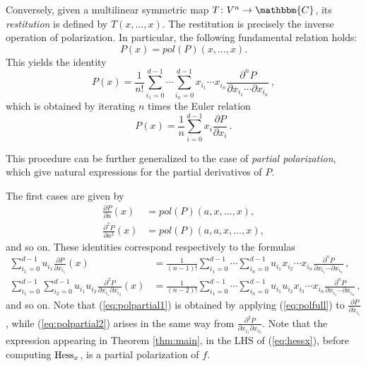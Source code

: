 \documentclass[aps,floatfix,groupedaddress,superscriptaddress,longbibliography,footinbib,notitlepage,showpacs]{revtex4-1}
\def\Hess{{\rm Hess}}
\begin{document}
Conversely, given a multilinear symmetric map $T\colon V^{n}\to\mathbbm{C}$, its \emph{restitution} is defined by 
$T(x,\ldots, x)$. The restitution is precisely the inverse operation of polarization. In particular, the following fundamental relation holds:
\begin{equation}
P(x)=pol(P)(x,\ldots, x).
\end{equation}
This yields the identity
\begin{equation}\label{eq:polfull}
P(x) = \frac{1}{n!}\sum_{i_1=0}^{d-1}\cdots\sum_{i_n=0}^{d-1}
x_{i_1}\cdots x_{i_n}\frac{\partial^n P}{\partial x_{i_1}\cdots \partial x_{i_n}}\,,
\end{equation}
which is obtained by iterating $n$ times the Euler relation
\begin{equation}
P(x)=\frac{1}{n}\sum_{i=0}^{d-1}x_i\frac{\partial P}{\partial x_i}\,.
\end{equation}


This procedure can be further generalized to the case of \emph{partial polarization}, which give natural expressions for the partial derivatives of $P$. 

The first cases are given by
\begin{align}
\frac{\partial P}{\partial a}(x)&=pol(P)(a,x,\ldots, x), \\
\frac{\partial^2 P}{\partial a^2}(x)&=pol(P)(a,a,x,\ldots, x),
\end{align}
and so on. These identities correspond respectively to the formulas
\begin{align}\label{eq:polpartial1}
\sum_{i_1=0}^{d-1}u_{i_1}\frac{\partial P}{\partial x_{i_1}}(x) &= \frac{1}{(n-1)!}\sum_{i_1=0}^{d-1}\cdots\sum_{i_n=0}^{d-1}
u_{i_1}x_{i_2}\cdots x_{i_n}\frac{\partial^n P}{\partial x_{i_1}\cdots\partial x_{i_n}}\,, \\ \label{eq:polpartial2}
\sum_{i_1=0}^{d-1}\sum_{i_2=0}^{d-1}u_{i_1}u_{i_2}
\frac{\partial^2 P}{\partial x_{i_1}\partial x_{i_2}}(x) &= \frac{1}{(n-2)!}\sum_{i_1=0}^{d-1}\cdots\sum_{i_n=0}^{d-1}
u_{i_1}u_{i_2}x_{i_3}\cdots x_{i_n}\frac{\partial^n P}{\partial x_{i_1}\cdots\partial x_{i_n}}\,,
\end{align}
and so on. Note that (\ref{eq:polpartial1}) is obtained by applying (\ref{eq:polfull}) to $\frac{\partial P}{\partial x_{i_1}}$, while (\ref{eq:polpartial2}) arises in the same way from $\frac{\partial^2 P}{\partial x_{i_1}\partial x_{i_2}}$. Note that the expression appearing in Theorem \ref{thm:main}, in the LHS of (\ref{eq:hessx}), before computing $\Hess_x$, is a partial polarization of $f$. 
\end{document}
